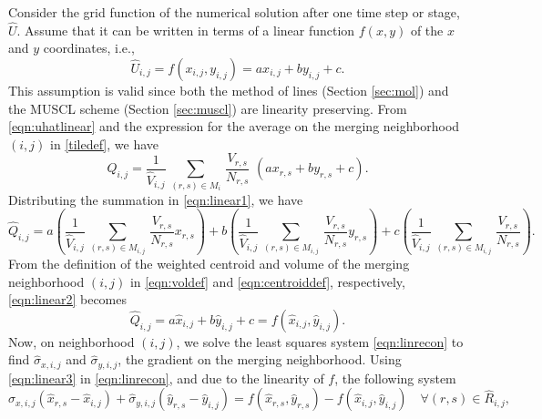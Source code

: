 Consider the grid function of the numerical solution after one time step
or stage, $\widehat{U}$.  Assume that it can be written in terms of a linear function $f(x,y)$ of the $x$ and $y$ coordinates, i.e.,
\begin{equation}
    \label{eqn:uhatlinear}
\widehat{U}_{i,j} = f(x_{i,j},y_{i,j}) = ax_{i,j} + by_{i,j} + c.
\end{equation}
This assumption is valid since both the method of lines (Section \ref{sec:mol}) and the MUSCL scheme (Section \ref{sec:muscl}) are linearity preserving.  
From \eqref{eqn:uhatlinear} and the expression for the average on the merging neighborhood $(i,j)$ in \eqref{tiledef}, we have
\begin{equation}
    \label{eqn:linear1}
\widehat{Q}_{i,j} = \frac{1}{{\widehat V}_{i,j}} \, \sum_{(r,s) \in M_i} \,  
\frac{V_{r,s}}{N_{r,s}}  \,\, (ax_{r,s} + by_{r,s} + c).
\end{equation}
Distributing the summation in \eqref{eqn:linear1}, we have
\begin{equation}\label{eqn:linear2}
\widehat{Q}_{i,j} =  a \left(\frac{1}{{\widehat V}_{i,j}} \, \sum_{(r,s) \in M_{i,j}} \,  
\frac{V_{r,s}}{N_{r,s}} x_{r,s} \right) + b\left(\frac{1}{{\widehat V}_{i,j}} \, \sum_{(r,s) \in M_{i,j}} \,  
\frac{V_{r,s}}{N_{r,s}} y_{r,s} \right) + c\left(\frac{1}{{\widehat V}_{i,j}} \, \sum_{(r,s) \in M_{i,j}} \,
\frac{V_{r,s}}{N_{r,s}}\right) .
\end{equation}
From the definition of the weighted centroid and volume of the merging neighborhood
$(i,j)$ in \eqref{eqn:voldef} and \eqref{eqn:centroiddef}, respectively, \eqref{eqn:linear2} becomes
\begin{equation}\label{eqn:linear3}
\widehat{Q}_{i,j} =  a \widehat{x}_{i,j} + b\widehat{y}_{i,j} + c = f(\widehat{x}_{i,j},\widehat{y}_{i,j}).
\end{equation}
Now, on neighborhood $(i,j)$, we solve the least squares system 
\eqref{eqn:linrecon} to find $\widehat{\sigma}_{x,i,j}$ and
$\widehat{\sigma}_{y,i,j}$, the gradient on the merging neighborhood.  Using
\eqref{eqn:linear3} in \eqref{eqn:linrecon}, and due to the linearity of $f$, the following system
\begin{equation}
\widehat{\sigma}_{x,i,j}(\widehat{x}_{r,s} - \widehat{x}_{i,j}) + \widehat{\sigma}_{y,i,j}(\widehat{y}_{r,s} - \widehat{y}_{i,j})= f(\widehat{x}_{r,s}, \widehat{y}_{r,s}) - f(\widehat{x}_{i,j}, \widehat{y}_{i,j}) \quad \forall (r,s) \in \widehat{R}_{i,j},
\end{equation}
